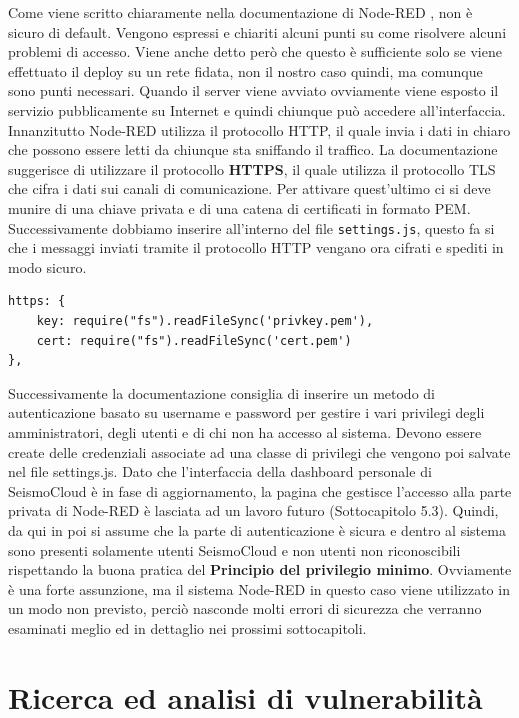 \documentclass[a4paper,10pt]{memoir}
\begin{document}
Come viene scritto chiaramente nella documentazione di Node-RED \cite{securing}, non è sicuro di default.
Vengono espressi e chiariti alcuni punti su come risolvere alcuni problemi di accesso.
Viene anche detto però che questo è sufficiente solo se viene effettuato il deploy su un rete fidata, non il nostro caso quindi, ma comunque sono punti necessari.
Quando il server viene avviato ovviamente viene esposto il servizio pubblicamente su Internet e quindi chiunque può accedere all'interfaccia.
Innanzitutto Node-RED utilizza il protocollo HTTP, il quale invia i dati in chiaro che possono essere letti da chiunque sta sniffando il traffico.
La documentazione suggerisce di utilizzare il protocollo \textbf{HTTPS}, il quale utilizza il protocollo TLS che cifra i dati sui canali di comunicazione.
Per attivare quest'ultimo ci si deve munire di una chiave privata e di una catena di certificati in formato PEM.
Successivamente dobbiamo inserire all'interno del file \texttt{settings.js}, questo fa si che i messaggi inviati tramite il protocollo HTTP vengano ora cifrati e spediti in modo sicuro.
\begin{lstlisting}
https: {
    key: require("fs").readFileSync('privkey.pem'),
    cert: require("fs").readFileSync('cert.pem')
},
\end{lstlisting}

Successivamente la documentazione consiglia di inserire un metodo di autenticazione basato su username e password per gestire i vari privilegi degli amministratori, degli utenti e di chi non ha accesso al sistema.
Devono essere create delle credenziali associate ad una classe di privilegi che vengono poi salvate nel file settings.js.
Dato che l'interfaccia della dashboard personale di SeismoCloud è in fase di aggiornamento, la pagina che gestisce l'accesso alla parte privata di Node-RED è lasciata ad un lavoro futuro (Sottocapitolo 5.3).
Quindi, da qui in poi si assume che la parte di autenticazione è sicura e dentro al sistema sono presenti solamente utenti SeismoCloud e non utenti non riconoscibili rispettando la buona pratica del \textbf{Principio del privilegio minimo}. Ovviamente è una forte assunzione, ma il sistema Node-RED in questo caso viene utilizzato in un modo non previsto, perciò nasconde molti errori di sicurezza che verranno esaminati meglio ed in dettaglio nei prossimi sottocapitoli.

\clearpage

\section{Ricerca ed analisi di vulnerabilità}
\end{document}
